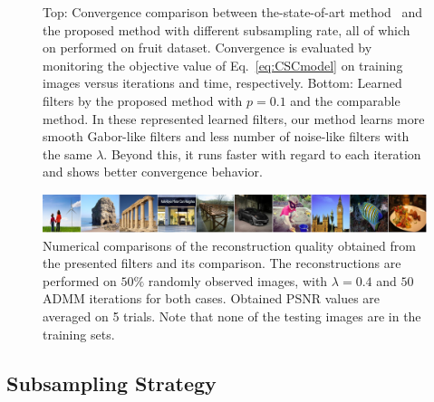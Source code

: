 \begin{figure}[h]
\caption{Top: Convergence comparison between the-state-of-art method~\cite{heide2015fast} and the proposed method with different subsampling rate, all of which on performed on fruit dataset. Convergence is evaluated by monitoring the objective value of Eq.~\ref{eq:CSCmodel} on training images versus iterations and time, respectively. Bottom: Learned filters by the proposed method with $p=0.1$ and the comparable method. In these represented learned filters, our method learns more smooth Gabor-like filters and less number of noise-like filters with the same $\lambda$. Beyond this, it runs faster with regard to each iteration and shows better convergence behavior.}
\label{fig:subsampleResult}
\end{figure}

\begin{figure}[h]
    \centering
    \includegraphics[width=1\textwidth]{figure/reconImage.pdf}
    \caption{Numerical comparisons of the reconstruction quality obtained from the presented filters and its comparison. The reconstructions are performed on $50\%$ randomly observed images, with $\lambda = 0.4$ and $50$ ADMM iterations for both cases. Obtained PSNR values are averaged on 5 trials. Note that none of the testing images are in the training sets.} \label{fig:PSNRrecon}
\end{figure}

\subsection{Subsampling Strategy}

